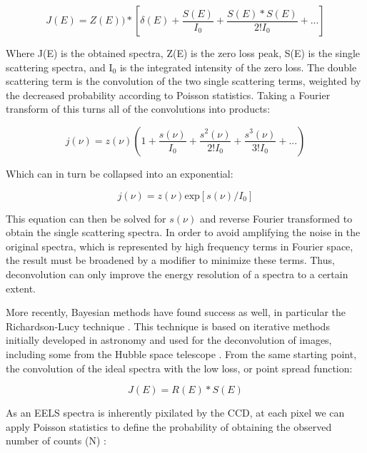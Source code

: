 \begin{equation}
 	J(E) = Z(E))\ast[\delta(E) + \frac{S(E)}{I_0} +  \frac{S(E) \ast S(E)}{2! I_0}   + ...]
\end{equation}



Where J(E) is the obtained spectra, Z(E) is the zero loss peak, S(E) is the single scattering spectra, and I$_0$ is the integrated intensity of the zero loss.  The double scattering term is the convolution of the two single scattering terms, weighted by the decreased probability according to Poisson statistics.   Taking a Fourier transform of this turns all of the convolutions into products: 

\begin{equation}
	j(\nu) = z(\nu) \left(1+\frac{s(\nu)}{I_0}+   \frac{s^2(\nu)}{2! I_0}+ \frac{s^3(\nu)}{3! I_0} + ...\right)
	\label{fourier_spectra}
\end{equation} 

Which can in turn be collapsed into an exponential:

\begin{equation}
	j(\nu) = z(\nu)\mathrm{exp}[s(\nu)/I_0]
\end{equation}

This equation can then be solved for $s(\nu)$ and reverse Fourier transformed to obtain the single scattering spectra.  In order to avoid amplifying the noise in the original spectra, which is represented by high frequency terms in Fourier space, the result must be broadened by a modifier to minimize these terms.  Thus, deconvolution can only improve the energy resolution of a spectra to a certain extent.  

More recently, Bayesian methods have found success as well, in particular the Richardson-Lucy technique \cite{richardson_lucy}. This technique is based on iterative methods initially developed in astronomy and used for the deconvolution of images, including some from the Hubble space telescope \cite{hubble}.  From the same starting point, the convolution of the ideal spectra with the low loss, or point spread function:

\begin{equation}
J(E) = R(E)\ast S(E)
\end{equation}

As an EELS spectra is inherently pixilated by the CCD, at each pixel we can apply Poisson statistics to define the probability of obtaining the observed number of counts (N) \cite{richardson_lucy}:  


